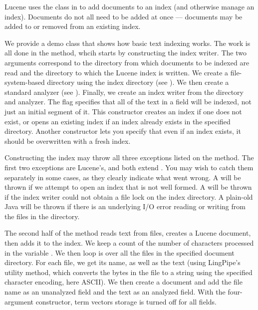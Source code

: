 Lucene uses the  class in
 to add documents to an index (and
otherwise manage an index).  Documents do not all need to be added at
once --- documents may be added to or removed from an existing index.

We provide a demo class  that shows how basic
text indexing works.  The work is all done in the  method,
whcih starts by constructing the index writer.
%
%
The two arguments correspond to the directory from which documents to
be indexed are read and the directory to which the Lucene index is
written.  We create a file-system-based directory using the index
directory (see ).  We then create a standard
analyzer (see ).  Finally, we create an index
writer from the directory and analyzer.  The flag 
specifies that all of the text in a field will be indexed, not just an
initial segment of it.  This constructor creates an index if one does
not exist, or opens an existing index if an index already exists in
the specified directory.  Another constructor lets you specify that
even if an index exists, it should be overwritten with a fresh index.

Constructing the index may throw all three exceptions listed on the
 method.  The first two exceptions are Lucene's, and both
extend .  You may wish to catch them separately in
some cases, as they clearly indicate what went wrong. A
 will be thrown if we attempt to open an
index that is not well formed.  A 
will be thrown if the index writer could not obtain a file lock on the
index directory.  A plain-old Java  will be thrown
if there is an underlying I/O error reading or writing from the files
in the directory.

The second half of the  method reads text from files,
creates a Lucene document, then adds it to the index.
%
%
We keep a count of the number of characters processed in the variable
.  We then loop is over all the files in the specified
document directory.  For each file, we get its name, as well as the
text (using LingPipe's  utility method, which
converts the bytes in the file to a string using the specified
character encoding, here ASCII).  We then create a document and add
the file name as an unanalyzed field and the text as an analyzed
field.  With the four-argument  constructor, term vectors
storage is turned off for all fields.

